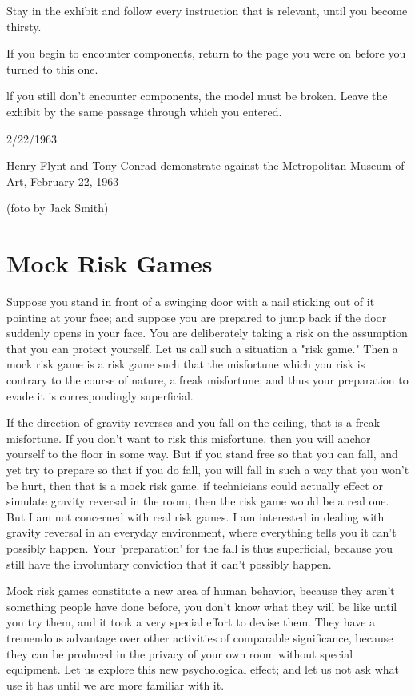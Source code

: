\documentclass[10pt,twoside,draft]{memoir}
\begin{document}
{{\clearpage

Stay in the exhibit and follow every instruction that is relevant, until
you become thirsty. 


If you begin to encounter components, return to the page you were on 
before you turned to this one. 


lf you still don't encounter components, the model must be broken. 
Leave the exhibit by the same passage through which you entered. 

\clearpage


2/22/1963 


Henry Flynt and Tony Conrad demonstrate against the Metropolitan Museum of Art, 
February 22, 1963 


(foto by Jack Smith)

\chapter{Mock Risk Games}


Suppose you stand in front of a swinging door with a nail sticking out of it 
pointing at your face; and suppose you are prepared to jump back if the 
door suddenly opens in your face. You are deliberately taking a risk on the 
assumption that you can protect yourself. Let us call such a situation a "risk 
game." Then a mock risk game is a risk game such that the misfortune which 
you risk is contrary to the course of nature, a freak misfortune; and thus 
your preparation to evade it is correspondingly superficial. 

If the direction of gravity reverses and you fall on the ceiling, that is a 
freak misfortune. If you don't want to risk this misfortune, then you will 
anchor yourself to the floor in some way. But if you stand free so that you 
can fall, and yet try to prepare so that if you do fall, you will fall in such a 
way that you won't be hurt, then that is a mock risk game. if technicians 
could actually effect or simulate gravity reversal in the room, then the risk 
game would be a real one. But I am not concerned with real risk games. I am 
interested in dealing with gravity reversal in an everyday environment, where 
everything tells you it can't possibly happen. Your 'preparation' for the fall 
is thus superficial, because you still have the involuntary conviction that it 
can't possibly happen. 

Mock risk games constitute a new area of human behavior, because they 
aren't something people have done before, you don't know what they will be 
like until you try them, and it took a very special effort to devise them. 
They have a tremendous advantage over other activities of comparable 
significance, because they can be produced in the privacy of your own room 
without special equipment. Let us explore this new psychological effect; and 
let us not ask what use it has until we are more familiar with it. 

}}
\end{document}
